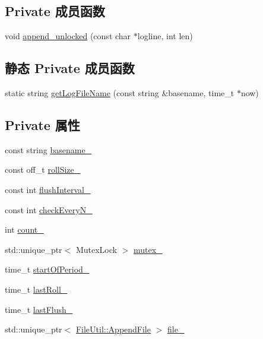 \subsection*{Private 成员函数}
\begin{DoxyCompactItemize}
\item 
void \hyperlink{classmuduo_1_1LogFile_a85c3e488a17ea1be47a6076be65555f6}{append\+\_\+unlocked} (const char $\ast$logline, int len)
\end{DoxyCompactItemize}
\subsection*{静态 Private 成员函数}
\begin{DoxyCompactItemize}
\item 
static string \hyperlink{classmuduo_1_1LogFile_a1f85038b0d321b9c1bd0b4823675928f}{get\+Log\+File\+Name} (const string \&basename, time\+\_\+t $\ast$now)
\end{DoxyCompactItemize}
\subsection*{Private 属性}
\begin{DoxyCompactItemize}
\item 
const string \hyperlink{classmuduo_1_1LogFile_a13e75d6811d8c75146c98ff19a60aaa2}{basename\+\_\+}
\item 
const off\+\_\+t \hyperlink{classmuduo_1_1LogFile_a72b49897d1dce777946cab0186c07b3b}{roll\+Size\+\_\+}
\item 
const int \hyperlink{classmuduo_1_1LogFile_a5014f30709157722cd5b45a4096add3b}{flush\+Interval\+\_\+}
\item 
const int \hyperlink{classmuduo_1_1LogFile_af28df14a2094fcaa8678019193af9980}{check\+Every\+N\+\_\+}
\item 
int \hyperlink{classmuduo_1_1LogFile_a9acf5084c965a76d24ec228412256bc3}{count\+\_\+}
\item 
std\+::unique\+\_\+ptr$<$ Mutex\+Lock $>$ \hyperlink{classmuduo_1_1LogFile_a7ab6af9f2792620f0435aa53adc4e42b}{mutex\+\_\+}
\item 
time\+\_\+t \hyperlink{classmuduo_1_1LogFile_a89cc5f58496ca774ea8c752113a0640d}{start\+Of\+Period\+\_\+}
\item 
time\+\_\+t \hyperlink{classmuduo_1_1LogFile_a6f1ebe127ae831aacb7f4e96824985ad}{last\+Roll\+\_\+}
\item 
time\+\_\+t \hyperlink{classmuduo_1_1LogFile_a1260b5b02152747773bfe1c6085a8af9}{last\+Flush\+\_\+}
\item 
std\+::unique\+\_\+ptr$<$ \hyperlink{classmuduo_1_1FileUtil_1_1AppendFile}{File\+Util\+::\+Append\+File} $>$ \hyperlink{classmuduo_1_1LogFile_a1dd855a8bfbb820c9954f6d5a7647849}{file\+\_\+}
\end{DoxyCompactItemize}
